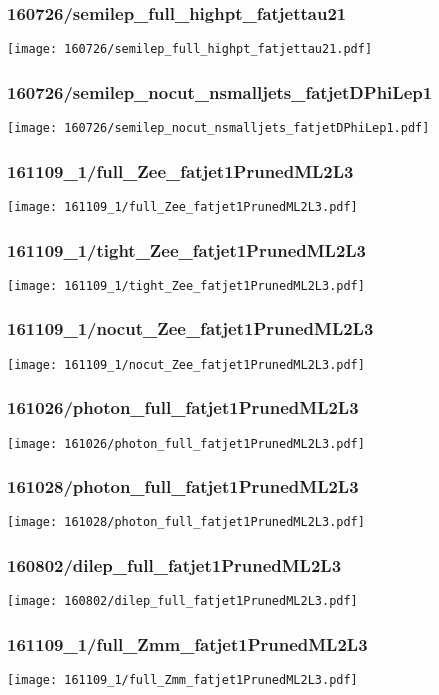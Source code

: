 \begin{frame}
   \frametitle{\small 160726/semilep\_full\_highpt\_fatjettau21}
   \centering
   \texttt{[image: 160726/semilep\_full\_highpt\_fatjettau21.pdf]}
\end{frame}

\begin{frame}
   \frametitle{\small 160726/semilep\_nocut\_nsmalljets\_fatjetDPhiLep1}
   \centering
   \texttt{[image: 160726/semilep\_nocut\_nsmalljets\_fatjetDPhiLep1.pdf]}
\end{frame}

\begin{frame}
   \frametitle{\small 161109\_1/full\_Zee\_fatjet1PrunedML2L3}
   \centering
   \texttt{[image: 161109\_1/full\_Zee\_fatjet1PrunedML2L3.pdf]}
\end{frame}

\begin{frame}
   \frametitle{\small 161109\_1/tight\_Zee\_fatjet1PrunedML2L3}
   \centering
   \texttt{[image: 161109\_1/tight\_Zee\_fatjet1PrunedML2L3.pdf]}
\end{frame}

\begin{frame}
   \frametitle{\small 161109\_1/nocut\_Zee\_fatjet1PrunedML2L3}
   \centering
   \texttt{[image: 161109\_1/nocut\_Zee\_fatjet1PrunedML2L3.pdf]}
\end{frame}

\begin{frame}
   \frametitle{\small 161026/photon\_full\_fatjet1PrunedML2L3}
   \centering
   \texttt{[image: 161026/photon\_full\_fatjet1PrunedML2L3.pdf]}
\end{frame}

\begin{frame}
   \frametitle{\small 161028/photon\_full\_fatjet1PrunedML2L3}
   \centering
   \texttt{[image: 161028/photon\_full\_fatjet1PrunedML2L3.pdf]}
\end{frame}

\begin{frame}
   \frametitle{\small 160802/dilep\_full\_fatjet1PrunedML2L3}
   \centering
   \texttt{[image: 160802/dilep\_full\_fatjet1PrunedML2L3.pdf]}
\end{frame}

\begin{frame}
   \frametitle{\small 161109\_1/full\_Zmm\_fatjet1PrunedML2L3}
   \centering
   \texttt{[image: 161109\_1/full\_Zmm\_fatjet1PrunedML2L3.pdf]}
\end{frame}

